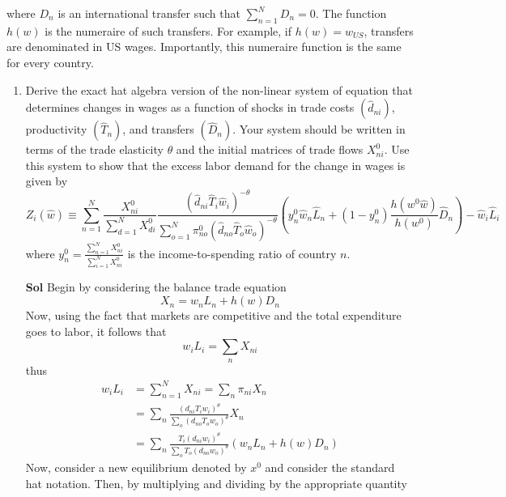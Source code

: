 \documentclass[12pt,oneside,reqno]{article}
\begin{document}
where $D_{n}$ is an international transfer such that $\sum_{n=1}^{N} D_{n}=0$. The function $h(w)$ is the numeraire of such transfers. For example, if $h(w)=w_{U S}$, transfers are denominated in US wages. Importantly, this numeraire function is the same for every country.
\begin{enumerate}[leftmargin=*, label=\textbf{(\roman*)}]
    \item Derive the exact hat algebra version of the non-linear system of equation that determines changes in wages as a function of shocks in trade costs $\left(\hat{d}_{n i}\right)$, productivity $\left(\hat{T}_{n}\right)$, and transfers $\left(\hat{D}_{n}\right)$. Your system should be written in terms of the trade elasticity $\theta$ and the initial matrices of trade flows $X_{n i}^{0}$. Use this system to show that the excess labor demand for the change in wages is given by
    \begin{equation*}
    Z_i(\hat{w}) \equiv \sum_{n=1}^N \frac{X_{ni}^0}{\sum_{d=1}^N X_{di}^0}\frac{\left(\hat{d}_{ni}\hat{T}_i\hat{w}_i\right)^{-\theta}}{\sum_{o=1}^N\pi_{no}^0\left(\hat{d}_{no}\hat{T}_o\hat{w}_o\right)^{-\theta}}\left( y_n^0\hat{w}_n\hat{L}_n+(1-y_n^0)\frac{h\left(w^0\hat{w}\right)}{h(w^0)}\hat{D}_n \right) - \hat{w}_i\hat{L}_i
    \end{equation*}
    where $y_{n}^{0}=\frac{\sum_{n=1}^{N} X_{n i}^{0}}{\sum_{i=1}^{N} X_{n i}^{0}}$ is the income-to-spending ratio of country $n$. 
    \item[\textbf{Sol}] Begin by considering the balance trade equation 
    \begin{equation*}
        X_n = w_nL_n +  h(w)D_n
    \end{equation*}
    Now, using the fact that markets are competitive and the total expenditure goes to labor, it follows that 
    \begin{equation*}
        w_iL_i = \sum_{n}X_{ni}
    \end{equation*}
    thus
    \begin{align*}
        w_iL_i &= \sum_{n=1}^NX_{ni} = \sum_{n}\pi_{ni}X_n\\ 
               &= \sum_{n}\frac{\left(d_{ni}T_iw_i\right)^\theta}{\sum_{o}\left(d_{no}T_ow_o\right)^\theta} X_n \\ 
               &= \sum_{n}\frac{T_i\left(d_{ni}w_i\right)^\theta}{\sum_{o}T_o\left(d_{no}w_o\right)^\theta} \left( w_nL_n +  h(w)D_n\right) 
    \end{align*}
    Now, consider a new equilibrium denoted by $x^0$ and consider the standard hat notation. Then, by multiplying and dividing by the appropriate quantity

\end{enumerate}
\end{document}
